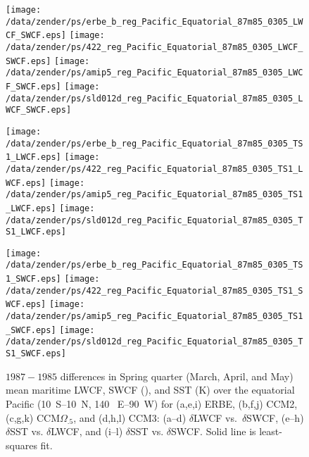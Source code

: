 \documentclass[twocolumn,final,11pt]{article}
\begin{document}
\begin{sidewaysfigure*}
\begin{center}
\texttt{[image: /data/zender/ps/erbe\_b\_reg\_Pacific\_Equatorial\_87m85\_0305\_LWCF\_SWCF.eps]}%
\texttt{[image: /data/zender/ps/422\_reg\_Pacific\_Equatorial\_87m85\_0305\_LWCF\_SWCF.eps]}%
\texttt{[image: /data/zender/ps/amip5\_reg\_Pacific\_Equatorial\_87m85\_0305\_LWCF\_SWCF.eps]}%
\texttt{[image: /data/zender/ps/sld012d\_reg\_Pacific\_Equatorial\_87m85\_0305\_LWCF\_SWCF.eps]}%

\texttt{[image: /data/zender/ps/erbe\_b\_reg\_Pacific\_Equatorial\_87m85\_0305\_TS1\_LWCF.eps]}%
\texttt{[image: /data/zender/ps/422\_reg\_Pacific\_Equatorial\_87m85\_0305\_TS1\_LWCF.eps]}%
\texttt{[image: /data/zender/ps/amip5\_reg\_Pacific\_Equatorial\_87m85\_0305\_TS1\_LWCF.eps]}%
\texttt{[image: /data/zender/ps/sld012d\_reg\_Pacific\_Equatorial\_87m85\_0305\_TS1\_LWCF.eps]}%

\texttt{[image: /data/zender/ps/erbe\_b\_reg\_Pacific\_Equatorial\_87m85\_0305\_TS1\_SWCF.eps]}%
\texttt{[image: /data/zender/ps/422\_reg\_Pacific\_Equatorial\_87m85\_0305\_TS1\_SWCF.eps]}%
\texttt{[image: /data/zender/ps/amip5\_reg\_Pacific\_Equatorial\_87m85\_0305\_TS1\_SWCF.eps]}%
\texttt{[image: /data/zender/ps/sld012d\_reg\_Pacific\_Equatorial\_87m85\_0305\_TS1\_SWCF.eps]}%
\end{center}
\caption[$1987-1985$ differences in Spring quarter (March, April, and
May) mean maritime LWCF, SWCF, and SST over the equatorial Pacific for
ERBE, CCM2, CCM$\Omega_{.5}$, and CCM3]{ 
$1987-1985$ differences in Spring quarter (March, April, and May) 
mean maritime LWCF, SWCF (\wxmS), and SST (\degreee K) over the
equatorial Pacific (10~\degreee S--10~\degreee N, 140~\degreee
E--90~\degreee W) for (a,e,i) ERBE, (b,f,j) CCM2, (c,g,k)
CCM$\Omega_{.5}$, and (d,h,l) CCM3: (a--d) $\delta$LWCF vs.\
$\delta$SWCF, (e--h) $\delta$SST vs. $\delta$LWCF, and (i--l)
$\delta$SST vs. $\delta$SWCF.
Solid line is least-squares fit.
\label{fig:reg_Pacific_Equatorial_87m85_0305_LWCF_SWCF}}   
\end{sidewaysfigure*}
\clearpage
\end{document}
